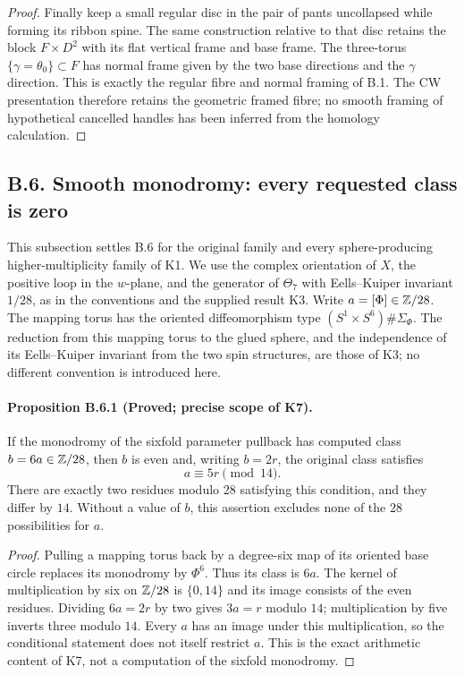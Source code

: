 \begin{proof}
Finally keep a small regular disc in the pair of
pants uncollapsed while forming its ribbon spine.
The same construction relative to that disc retains
the block $F\times D^2$ with its flat vertical
frame and base frame.  The three-torus
$\{\gamma=\theta_0\}\subset F$ has normal frame
given by the two base directions and the
$\gamma$ direction.  This is exactly the regular
fibre and normal framing of B.1.  The CW
presentation therefore retains the geometric
framed fibre; no smooth framing of hypothetical
cancelled handles has been inferred from the
homology calculation.
\end{proof}

\subsection{B.6. Smooth monodromy: every requested class is zero}

This subsection settles B.6 for the original family and every
sphere-producing higher-multiplicity family of K1. We use the complex
orientation of $X$, the positive loop in the $w$-plane, and the generator
of $\Theta_7$ with Eells--Kuiper invariant $1/28$, as in the conventions
and the supplied result K3. Write $a=[\Phi]\in\mathbb Z/28$. The mapping torus
has the oriented diffeomorphism type $(S^1\times S^6)\#\Sigma_\Phi$.
The reduction from this mapping torus to the glued sphere, and the
independence of its Eells--Kuiper invariant from the two spin structures,
are those of K3; no different convention is introduced here.

\paragraph{Proposition B.6.1 (Proved; precise scope of K7).}
If the monodromy of the sixfold parameter pullback has computed class
$b=6a\in\mathbb Z/28$, then $b$ is even and, writing $b=2r$, the original
class satisfies
\[
 a\equiv5r\pmod {14}.
\]
There are exactly two residues modulo $28$ satisfying this condition,
and they differ by $14$. Without a value of $b$, this assertion excludes
none of the $28$ possibilities for $a$.
\begin{proof}
Pulling a mapping torus back by a degree-six map of its oriented base
circle replaces its monodromy by $\Phi^6$. Thus its class is $6a$.
The kernel of multiplication by six on $\mathbb Z/28$ is $\{0,14\}$ and
its image consists of the even residues. Dividing $6a=2r$ by two gives
$3a=r$ modulo $14$; multiplication by five inverts three modulo $14$.
Every $a$ has an image under this multiplication, so the conditional
statement does not itself restrict $a$. This is the exact arithmetic
content of K7, not a computation of the sixfold monodromy.
\end{proof}


